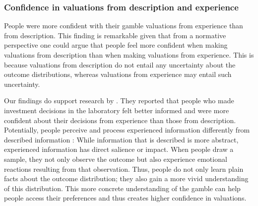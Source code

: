 \documentclass[a4paper, man, natbib, floatsintext]{apa6} %
\begin{document}
\subsubsection{Confidence in valuations from description and experience}
People were more confident with their gamble valuations from experience than from description. This finding is remarkable given that from a normative perspective one could argue that people feel more confident when making valuations from description than when making valuations from experience. This is because valuations from description do not entail any uncertainty about the outcome distributions, whereas valuations from experience may entail such uncertainty.

Our findings do support research by \cite{Bradbury2014}. They reported that people who made investment decisions in the laboratory felt better informed and were more confident about their decisions from experience than those from description.
Potentially, people perceive and process experienced information differently from described information \citep{Kahneman2009}: 
While information that is described is more abstract, experienced information has direct salience or impact. When people draw a sample, they not only observe the outcome but also experience emotional reactions resulting from that observation. Thus, people do not only learn plain facts about the outcome distribution; they also gain a more vivid understanding of this distribution. This more concrete understanding of the gamble can help people access their preferences and thus creates higher confidence in valuations.











\end{document}

